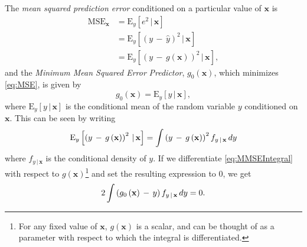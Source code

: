 \documentclass[graybox,envcountchap,sectrefs]{svmono}\usepackage[]{graphicx}\usepackage[]{xcolor}
\begin{document}
\begin{appendices}
{} The \emph{mean squared prediction error} conditioned on a particular
value of $\mathrm{\mathbf{x}}$ is
\begin{align}
{\mathrm{MSE}}_{\mathrm{\mathbf{x}}} & =\mathrm{E}_{y}\left[e^{2}\,|\,\mathrm{\mathbf{x}}\right]\nonumber \\
 & =\mathrm{E}_{y}\left[\left(y\,-\,\hat{y}\right)^{2}\,|\,\mathrm{\mathbf{x}}\right]\nonumber \\
 & =\mathrm{E}_{y}\left[\left(y\,-\,g\left(\mathrm{\mathbf{x}}\right)\right)^{2}\,|\,\mathrm{\mathbf{x}}\right],\label{eq:MSE}
\end{align}
and the \emph{Minimum Mean Squared Error} \emph{Predictor}, $g_{0}\left(\mathrm{\mathbf{x}}\right)$,
which minimizes \eqref{eq:MSE}, is given by
\begin{equation}
g_{0}\left(\mathrm{\mathbf{x}}\right)=\mathrm{E}_{y}\left[y\,|\,\mathrm{\mathbf{x}}\right],\label{eq:MMSEPredictor}
\end{equation}
where $\mathrm{E}_{y}\left[y\,|\,\mathrm{\mathbf{x}}\right]$ is the
conditional mean of the random variable $y$ conditioned on $\mathrm{\mathbf{x}}$.
This can be seen by writing
\begin{equation}
\mathrm{E}_{y}\left[\left(y\,-\,g\left(\mathrm{\mathbf{x}}\right)\right)^{2}\,|\,\mathrm{\mathbf{x}}\right]=\intop\left(y\,-\,g\left(\mathrm{\mathbf{x}}\right)\right)^{2}f_{y\,|\,\mathrm{\mathbf{x}}}\,dy\label{eq:MMSEIntegral}
\end{equation}
where $f_{y\,|\,\mathrm{\mathbf{x}}}$ is the conditional density
of $y$. If we differentiate \eqref{eq:MMSEIntegral} with respect
to $g\left(\mathrm{\mathbf{x}}\right)$\footnote{For any fixed value of $\mathrm{\mathbf{x}}$, $g\left(\mathrm{\mathbf{x}}\right)$
is a scalar, and can be thought of as a parameter with respect to
which the integral is differentiated.} and set the resulting expression to 0, we get
\begin{equation}
2\intop\left(g_{0}\left(\mathrm{\mathbf{x}}\right)\,-\,y\right)f_{y\,|\,\mathrm{\mathbf{x}}}\,dy=0.\label{eq:MMSEDerivativeEq0}
\end{equation}


\end{appendices}
\end{document}
